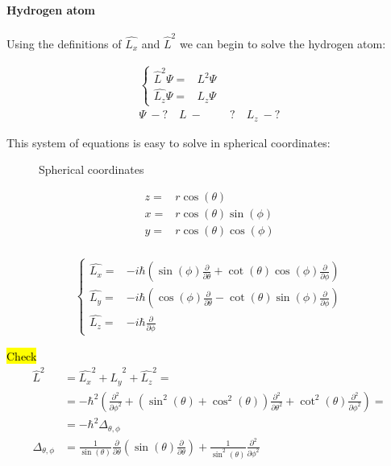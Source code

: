 	\paragraph{Hydrogen atom}		
	Using the definitions of $\hat{L_x}$ and $\hat{L}^2$ we can begin to solve the hydrogen atom:
	
	\begin{align}
		\left\{ \begin{aligned}
			\hat{L}^2 \Psi =& L^2 \Psi \\
			\hat{L_z} \Psi =& L_z \Psi  
		\end{aligned} \right. \\
		\Psi~-? \quad L~-&? \quad L_z~-? \nonumber
		\label{hydrogensystem1}
	\end{align}
	
	This system of equations is easy to solve in spherical coordinates:
	\begin{figure}[!h]
		\centering
		
		\caption{Spherical coordinates}
	\end{figure}
	
	\begin{align}
		z =& r \cos(\theta) \\ 
		x =& r \cos(\theta)\sin(\phi) \\ 
		y =& r \cos(\theta)\cos(\phi) \\ 								
	\end{align}
	
	\begin{align}
		\left\{ \begin{aligned}
			\hat{L_x} =& - i\hbar \left(\sin(\phi)\frac{\partial}{\partial \theta} + \cot(\theta)\cos(\phi)\frac{\partial}{\partial \phi}\right) \\
			\hat{L_y} =& - i\hbar \left(\cos(\phi)\frac{\partial}{\partial \theta} - \cot(\theta)\sin(\phi)\frac{\partial}{\partial \phi}\right) \\
			\hat{L_z} =& - i\hbar \frac{\partial}{\partial \phi}
		\end{aligned} \right.
	\end{align}
	
	\hl{Check}
	\begin{align}
		\hat{L}^2 	&= \hat{L_x}^2 + \hat{L_y}^2 + \hat{L_z}^2 = \\
		&= -\hbar^2 \left( \frac{\partial^2}{\partial \phi^2} + \left(\sin^2(\theta) + \cos^2(\theta) \right)\frac{\partial^2}{\partial \theta^2} + \cot^2(\theta) \frac{\partial^2}{\partial \phi^2} \right) = \\
		&= -\hbar^2 \Delta_{\theta, \phi} \\
		\Delta_{\theta, \phi} &= \frac{1}{\sin (\theta)}\frac{\partial}{\partial \theta}\left(\sin(\theta)\frac{\partial}{\partial \theta}\right) + \frac{1}{\sin^2(\theta)}\frac{\partial^2}{\partial \phi ^2}
	\end{align}
	
